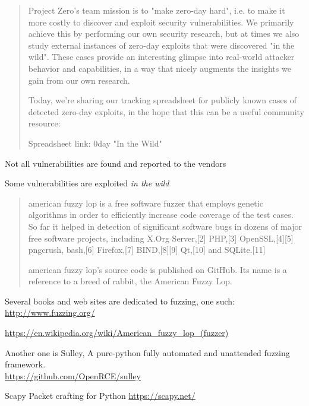 \documentclass[Screen16to9,17pt]{foils}
\begin{document}
\begin{quote}

  Project Zero's team mission is to "make zero-day hard", i.e. to make it more costly to discover and exploit security vulnerabilities. We primarily achieve this by performing our own security research, but at times we also study external instances of zero-day exploits that were discovered "in the wild". These cases provide an interesting glimpse into real-world attacker behavior and capabilities, in a way that nicely augments the insights we gain from our own research.

  Today, we're sharing our tracking spreadsheet for publicly known cases of detected zero-day exploits, in the hope that this can be a useful community resource:

  Spreadsheet link: 0day "In the Wild"\\
\end{quote}

\begin{list2}
\item Not all vulnerabilities are found and reported to the vendors
\item Some vulnerabilities are exploited \emph{in the wild}
\end{list2}



\begin{quote}
american fuzzy lop is a free software fuzzer that employs genetic algorithms in order to efficiently increase code coverage of the test cases. So far it helped in detection of significant software bugs in dozens of major free software projects, including X.Org Server,[2] PHP,[3] OpenSSL,[4][5] pngcrush, bash,[6] Firefox,[7] BIND,[8][9] Qt,[10] and SQLite.[11]

american fuzzy lop's source code is published on GitHub. Its name is a reference to a breed of rabbit, the American Fuzzy Lop.
\end{quote}

\begin{list2}
\item Several books and web sites are dedicated to fuzzing, one such:\\ \url{http://www.fuzzing.org/}
\item \url{https://en.wikipedia.org/wiki/American_fuzzy_lop_(fuzzer)}
\item Another one is Sulley, A pure-python fully automated and unattended fuzzing framework.\\
\url{https://github.com/OpenRCE/sulley}
\item Scapy Packet crafting for Python
\url{https://scapy.net/}
\end{list2}
\end{document}
